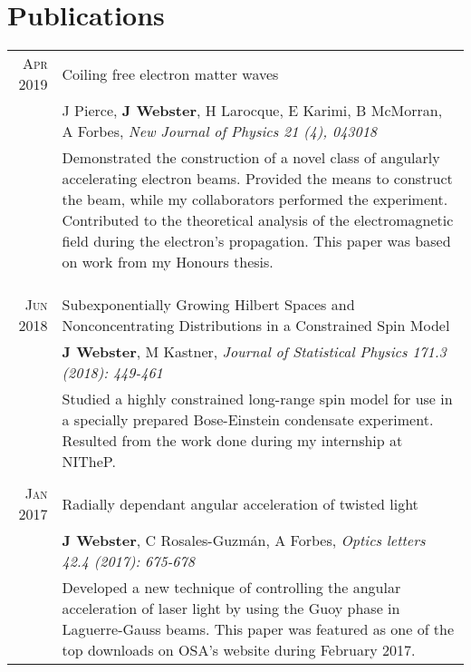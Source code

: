 \section{Publications}

\begin{supertabular}{rp{12cm}}
	\textsc{Apr 2019} & Coiling free electron matter waves \\
	& \small{J Pierce, \textbf{J Webster}, H Larocque, E Karimi, B McMorran, A Forbes, \emph{New Journal of Physics 21 (4), 043018}} \\
	& \footnotesize{Demonstrated the construction of a novel class of angularly accelerating electron beams. Provided the means to construct the beam, while my collaborators performed the experiment. Contributed to the theoretical analysis of the electromagnetic field during the electron’s propagation. This paper was based on work from my Honours thesis.} \\
	& \\
	& \\ %
	& \\
	\textsc{Jun 2018} & Subexponentially Growing Hilbert Spaces and Nonconcentrating Distributions in a Constrained Spin Model \\
	& \small{\textbf{J Webster}, M Kastner, \emph{Journal of Statistical Physics 171.3 (2018): 449-461}} \\
	& \footnotesize{Studied a highly constrained long-range spin model for use in a specially prepared Bose-Einstein condensate experiment. Resulted from the work done during my internship at NITheP.} \\
	& \\
	\textsc{Jan 2017} & Radially dependant angular acceleration of twisted light \\
	& \small{\textbf{J Webster}, C Rosales-Guzm\'an, A Forbes, \emph{Optics letters 42.4 (2017): 675-678}} \\
	& \footnotesize{Developed a new technique of controlling the angular acceleration of laser light by using the Guoy phase in Laguerre-Gauss beams. This paper was featured as one of the top downloads on OSA’s website during February 2017.}
\end{supertabular}